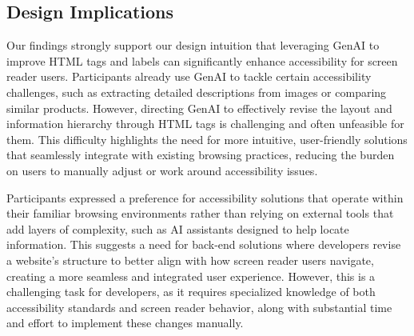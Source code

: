


\subsection{Design Implications}
Our findings strongly support our design intuition that leveraging GenAI to improve HTML tags and labels can significantly enhance accessibility for screen reader users. Participants already use GenAI to tackle certain accessibility challenges, such as extracting detailed descriptions from images or comparing similar products. However, directing GenAI to effectively revise the layout and information hierarchy through HTML tags is challenging and often unfeasible for them. This difficulty highlights the need for more intuitive, user-friendly solutions that seamlessly integrate with existing browsing practices, reducing the burden on users to manually adjust or work around accessibility issues.

Participants expressed a preference for accessibility solutions that operate within their familiar browsing environments rather than relying on external tools that add layers of complexity, such as AI assistants designed to help locate information. This suggests a need for back-end solutions where developers revise a website’s structure to better align with how screen reader users navigate, creating a more seamless and integrated user experience. However, this is a challenging task for developers, as it requires specialized knowledge of both accessibility standards and screen reader behavior, along with substantial time and effort to implement these changes manually.

